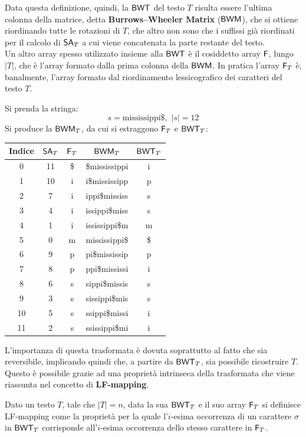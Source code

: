 Data questa definizione, quindi, la $\mbox{\rm {\sf BWT}}$ del testo $T$ risulta essere
l'ultima colonna della matrice, detta \textbf{Burrows--Wheeler Matrix} ($\mbox{\rm {\sf BWM}}$),
che si ottiene riordinando tutte le  
rotazioni di $T$, che altro non sono che i suffissi già riordinati per
il calcolo di $\mbox{\rm {\sf SA}}_T$ a cui viene concatenata la parte restante del
testo.\\
Un altro array spesso utilizzato insieme alla $\mbox{\rm {\sf BWT}}$ è il cosiddetto
array $\mbox{\rm {\sf F}}$, lungo $|T|$, che è l'array formato
dalla prima colonna della $\mbox{\rm {\sf BWM}}$. In pratica l'array $\mbox{\rm {\sf F}}_T$ è,
banalmente, l'array formato dal riordinamento 
lessicografico dei caratteri del testo $T$.
\begin{esempio}
  Si prenda la stringa:
  \[s=\mbox{mississippi\$},\,\,|s|=12\]
  Si produce la $\mbox{\rm {\sf BWM}}_T$, da cui si estraggono $\mbox{\rm {\sf F}}_T$ e $\mbox{\rm {\sf BWT}}_T$:
  \begin{table}[H]
    \centering
    \footnotesize
    \begin{tabular}{c|c|c|c|c} 
      \textbf{Indice} & $\mbox{\rm {\sf SA}}_T$ & $\mbox{\rm {\sf F}}_T$ & $\mbox{\rm {\sf BWM}}_T$
      & $\mbox{\rm {\sf BWT}}_T$\\ 
      \hline
      0 & 11 & \$ & \$mississippi & i\\
      1 & 10 & i & i\$mississipp & p\\
      2 & 7 & i & ippi\$mississ & s\\
      3 & 4 & i & issippi\$miss & s\\
      4 & 1 & i & ississippi\$m & m\\
      5 & 0 & m & mississippi\$ & \$\\
      6 & 9 & p & pi\$mississip & p\\
      7 & 8 & p & ppi\$mississi & i\\
      8 & 6 & s & sippi\$missis & s\\
      9 & 3 & s & sissippi\$mis & s\\
      10 & 5 & s & ssippi\$missi & i\\
      11 & 2 & s & ssissippi\$mi & i\\
    \end{tabular}
  \end{table}
\end{esempio}
L'importanza di questa trasformata è dovuta soprattutto al fatto che sia
reversibile, implicando quindi che, a partire da $\mbox{\rm {\sf BWT}}_T$, sia possibile
ricostruire $T$. Questo è possibile grazie ad una proprietà intrinseca della
trasformata che viene riassunta nel concetto di \textbf{LF-mapping}.
\begin{definizione}
  Dato un testo $T$, tale che $|T|=n$, data la sua $\mbox{\rm {\sf BWT}}_T$ e il suo array
  $\mbox{\rm {\sf F}}_T$ 
  si definisce LF-mapping come la proprietà per la quale l'$i$-esima
  occorrenza di un carattere $\sigma$ in $\mbox{\rm {\sf BWT}}_T$ corrisponde all'$i$-esima
  occorrenza dello stesso carattere in $\mbox{\rm {\sf F}}_T$.
\end{definizione}
